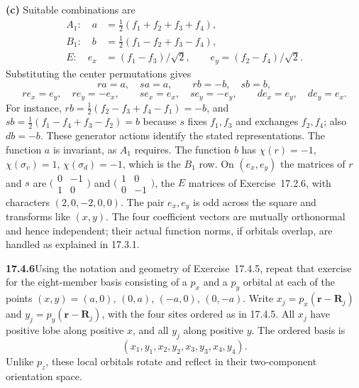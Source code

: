 \textbf{(c)} Suitable combinations are
\[
\boxed{\begin{aligned}
A_1:\quad a&=\tfrac12(f_1+f_2+f_3+f_4),\\
B_1:\quad b&=\tfrac12(f_1-f_2+f_3-f_4),\\
E:\quad e_x&=(f_1-f_3)/\sqrt2,\qquad
e_y=(f_2-f_4)/\sqrt2.
\end{aligned}}
\]
Substituting the center permutations gives
\[
ra=a,\quad sa=a,\qquad rb=-b,\quad sb=b,
\]
\[
re_x=e_y,\quad re_y=-e_x,\qquad se_x=e_x,\quad se_y=-e_y,
\qquad de_x=e_y,\quad de_y=e_x.
\]
For instance, $rb=\tfrac12(f_2-f_3+f_4-f_1)=-b$, and
$sb=\tfrac12(f_1-f_4+f_3-f_2)=b$ because $s$ fixes $f_1,f_3$ and
exchanges $f_2,f_4$; also $db=-b$. These generator actions identify
the stated representations. The function $a$ is invariant, as $A_1$
requires. The function $b$ has $\chi(r)=-1$, $\chi(\sigma_v)=1$,
$\chi(\sigma_d)=-1$, which is the $B_1$ row. On $(e_x,e_y)$ the
matrices of $r$ and $s$ are
$\bigl(\begin{smallmatrix}0&-1\\1&0\end{smallmatrix}\bigr)$ and
$\bigl(\begin{smallmatrix}1&0\\0&-1\end{smallmatrix}\bigr)$, the
$E$ matrices of Exercise~17.2.6, with characters $(2,0,-2,0,0)$.
The pair $e_x,e_y$ is odd across the square and transforms like
$(x,y)$.
The four coefficient vectors are mutually orthonormal and hence
independent; their actual function norms, if orbitals overlap,
are handled as explained in 17.3.1.

\par\bigskip
\noindent\textbf{17.4.6}\quad Using the notation and geometry of
Exercise~17.4.5, repeat that exercise for the eight-member basis
consisting of a $p_{x}$ and a $p_{y}$ orbital at each of the points
$(x,y)=(a,0)$, $(0,a)$, $(-a,0)$, $(0,-a)$.
\solution
Write $x_j=p_x(\mathbf r-\mathbf R_j)$ and
$y_j=p_y(\mathbf r-\mathbf R_j)$, with the four sites ordered
as in 17.4.5. All $x_j$ have positive lobe along positive $x$,
and all $y_j$ along positive $y$. The ordered basis is
\[
(x_1,y_1,x_2,y_2,x_3,y_3,x_4,y_4).
\]
Unlike $p_z$, these local orbitals rotate and reflect in their
two-component orientation space.


